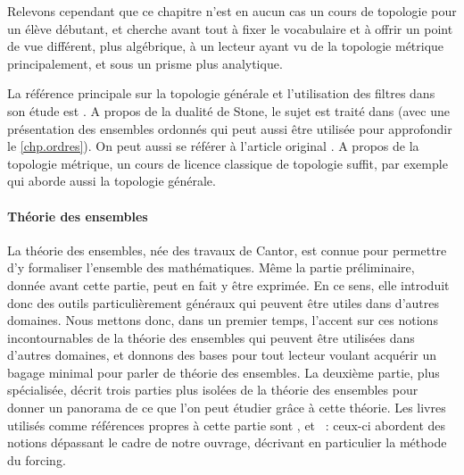 \begin{itemize}
  Relevons cependant que ce chapitre n'est en aucun cas un cours de topologie
  pour un élève débutant, et cherche avant tout à fixer le vocabulaire et à
  offrir un point de vue différent, plus algébrique, à un lecteur ayant vu de la
  topologie métrique principalement, et sous un prisme plus analytique.

  La référence principale sur la topologie générale et l'utilisation des filtres
  dans son étude est \cite{bourbaki1971topologie}. A propos de la dualité de
  Stone, le sujet est traité dans \cite{DBLP:books/daglib/0093287} (avec une
  présentation des ensembles ordonnés qui peut aussi être utilisée pour
  approfondir le \cref{chp.ordres}). On peut aussi se référer à l'article
  original \cite{StoneDuality}. A propos de la topologie métrique, un cours de
  licence classique de topologie suffit, par exemple \cite{hassan2021topologie}
  qui aborde aussi la topologie générale.
\end{itemize}

\paragraph{Théorie des ensembles}
La théorie des ensembles, née des travaux de Cantor, est connue pour permettre
d'y formaliser l'ensemble des mathématiques. Même la partie préliminaire, donnée
avant cette partie, peut en fait y être exprimée. En ce sens, elle introduit
donc des outils particulièrement généraux qui peuvent être utiles dans d'autres
domaines. Nous mettons donc, dans un premier temps, l'accent sur ces notions
incontournables de la théorie des ensembles qui peuvent être utilisées dans
d'autres domaines, et donnons des bases pour tout lecteur voulant acquérir un
bagage minimal pour parler de théorie des ensembles. La deuxième partie, plus
spécialisée, décrit trois parties plus isolées de la théorie des ensembles pour
donner un panorama de ce que l'on peut étudier grâce à cette théorie. Les livres
utilisés comme références propres à cette partie sont \cite{krivine1998théorie},
\cite{dehornoy2017théorie} et \cite{DBLP:books/daglib/0067194}~: ceux-ci
abordent des notions dépassant le cadre de notre ouvrage, décrivant en
particulier la méthode du forcing.

